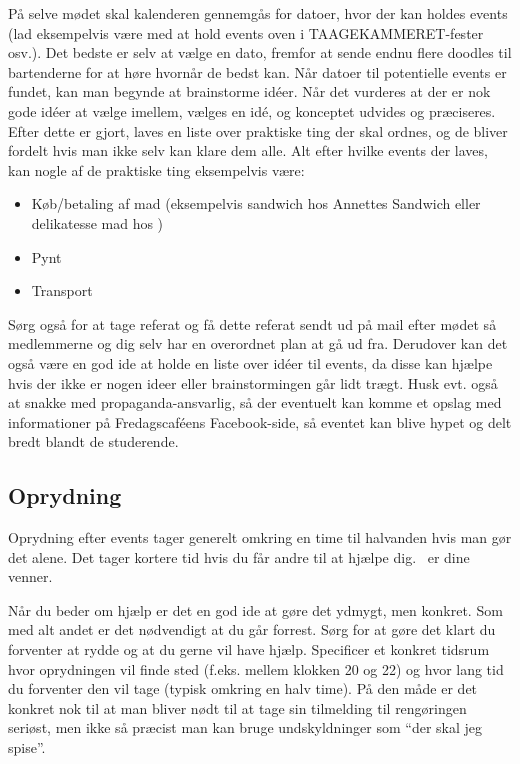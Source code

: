 På selve mødet skal kalenderen gennemgås for datoer, hvor der kan
holdes events (lad eksempelvis være med at hold events oven i
TAAGEKAMMERET-fester osv.). Det bedste er selv at vælge en dato,
fremfor at sende endnu flere doodles til bartenderne for at høre
hvornår de bedst kan. Når datoer til potentielle events er fundet, kan
man begynde at brainstorme idéer. Når det vurderes at der er nok gode
idéer at vælge imellem, vælges en idé, og konceptet udvides og
præciseres. Efter dette er gjort, laves en liste over praktiske ting
der skal ordnes, og de bliver fordelt hvis man ikke selv kan klare dem
alle. Alt efter hvilke events der laves, kan nogle af de praktiske
ting eksempelvis være:
\begin{itemize}
\item Køb/betaling af mad (eksempelvis sandwich hos Annettes Sandwich
  eller delikatesse mad hos \fotex)
\item Pynt
\item Transport
\end{itemize}

Sørg også for at tage referat og få dette referat sendt ud på mail
efter mødet så medlemmerne og dig selv har en overordnet plan at gå ud
fra. Derudover kan det også være en god ide at holde en liste over
idéer til events, da disse kan hjælpe hvis der ikke er nogen ideer
eller brainstormingen går lidt trægt. Husk evt. også at snakke med
propaganda-ansvarlig, så der eventuelt kan komme et opslag med
informationer på Fredagscaféens Facebook-side, så eventet kan blive
hypet og delt bredt blandt de studerende.

\subsection{Oprydning}
\label{sec:oprydning}

Oprydning efter events tager generelt omkring en time til halvanden
hvis man gør det alene. Det tager kortere tid hvis du får andre til at
hjælpe dig. \allemail\ er dine venner.

Når du beder om hjælp er det en god ide at gøre det ydmygt, men
konkret. Som med alt andet er det nødvendigt at du går forrest. Sørg
for at gøre det klart du forventer at rydde og at du gerne vil have
hjælp. Specificer et konkret tidsrum hvor oprydningen vil finde sted
(f.eks. mellem klokken 20 og 22) og hvor lang tid du forventer den vil
tage (typisk omkring en halv time). På den måde er det konkret nok til
at man bliver nødt til at tage sin tilmelding til rengøringen seriøst,
men ikke så præcist man kan bruge undskyldninger som ``der skal jeg
spise''.

